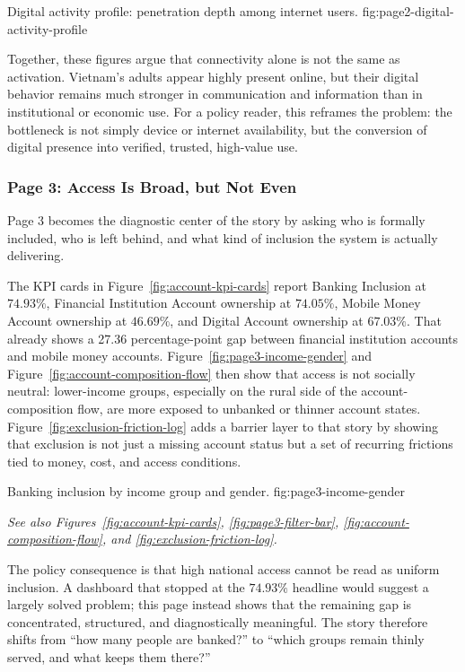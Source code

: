 \documentclass[../main.tex]{subfiles}
\begin{document}
{Digital activity profile: penetration depth among internet users.}
{fig:page2-digital-activity-profile}

Together, these figures argue that connectivity alone is not the same as
activation. Vietnam's adults appear highly present online, but their digital
behavior remains much stronger in communication and information than in
institutional or economic use. For a policy reader, this reframes the problem:
the bottleneck is not simply device or internet availability, but the
conversion of digital presence into verified, trusted, high-value use.

\subsubsection{Page 3: Access Is Broad, but Not Even}
\label{subsubsec:page3-access}

Page 3 becomes the diagnostic center of the story by asking who is formally
included, who is left behind, and what kind of inclusion the system is actually
delivering.

The KPI cards in Figure~\ref{fig:account-kpi-cards} report Banking Inclusion at
\(74.93\%\), Financial Institution Account ownership at \(74.05\%\), Mobile
Money Account ownership at \(46.69\%\), and Digital Account ownership at
\(67.03\%\). That already shows a 27.36 percentage-point gap between financial
institution accounts and mobile money accounts. Figure~\ref{fig:page3-income-gender}
and Figure~\ref{fig:account-composition-flow} then show that access is not
socially neutral: lower-income groups, especially on the rural side of the
account-composition flow, are more exposed to unbanked or thinner account
states. Figure~\ref{fig:exclusion-friction-log} adds a barrier layer to that
story by showing that exclusion is not just a missing account status but a set
of recurring frictions tied to money, cost, and access conditions.

{Banking inclusion by income group and gender.}
{fig:page3-income-gender}

\noindent\textit{See also Figures~\ref{fig:account-kpi-cards},
\ref{fig:page3-filter-bar}, \ref{fig:account-composition-flow}, and
\ref{fig:exclusion-friction-log}.}

The policy consequence is that high national access cannot be read as uniform
inclusion. A dashboard that stopped at the \(74.93\%\) headline would suggest a
largely solved problem; this page instead shows that the remaining gap is
concentrated, structured, and diagnostically meaningful. The story therefore
shifts from ``how many people are banked?'' to ``which groups remain thinly
served, and what keeps them there?''
\end{document}

